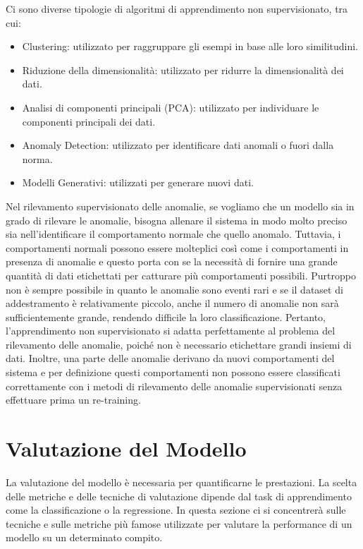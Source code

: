 Ci sono diverse tipologie di algoritmi di apprendimento non supervisionato, tra cui:
\begin{itemize}
\item Clustering: utilizzato per raggruppare gli esempi in base alle loro similitudini.
\item Riduzione della dimensionalità: utilizzato per ridurre la dimensionalità dei dati.
\item Analisi di componenti principali (PCA): utilizzato per individuare le componenti principali dei dati.
\item Anomaly Detection: utilizzato per identificare dati anomali o fuori dalla norma.
\item Modelli Generativi: utilizzati per generare nuovi dati.


\end{itemize}
Nel rilevamento supervisionato delle anomalie, se vogliamo che un modello sia in grado di rilevare le anomalie, bisogna allenare il sistema in modo molto preciso sia nell'identificare il comportamento normale che quello anomalo.
Tuttavia, i comportamenti normali possono essere molteplici così come i
comportamenti in presenza di anomalie e questo porta con se la necessità di fornire una grande quantità di dati etichettati per catturare più comportamenti possibili. Purtroppo non è sempre possibile in quanto le anomalie sono eventi rari e se il dataset di addestramento è relativamente piccolo, anche il numero di anomalie non sarà sufficientemente grande, rendendo difficile la loro classificazione. 
Pertanto, l'apprendimento non supervisionato si adatta perfettamente al problema del rilevamento delle anomalie, poiché non è necessario etichettare grandi insiemi di dati. Inoltre, una parte delle anomalie derivano da nuovi comportamenti del sistema e per definizione questi comportamenti non possono essere classificati correttamente con i metodi di rilevamento delle anomalie supervisionati senza effettuare prima un re-training.


\section{Valutazione del Modello}
La valutazione del modello è necessaria per quantificarne le prestazioni. La
scelta delle metriche e delle tecniche di valutazione dipende dal task di apprendimento come la classificazione o la regressione. 
In questa sezione ci si concentrerà sulle tecniche e sulle metriche più famose utilizzate per valutare la performance di un modello su un determinato compito.

